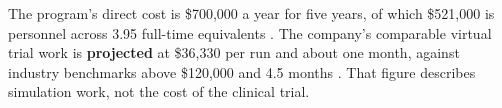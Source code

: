 The program's direct cost is \$700,000 a year for five years, of which \$521,000
is personnel across 3.95 full-time equivalents \cite{movein2026}. The company's
comparable virtual trial work is \textbf{projected} at \$36,330 per run and about
one month, against industry benchmarks above \$120,000 and 4.5 months
\cite{capitalplan2026}. That figure describes simulation work, not the cost of
the clinical trial.
